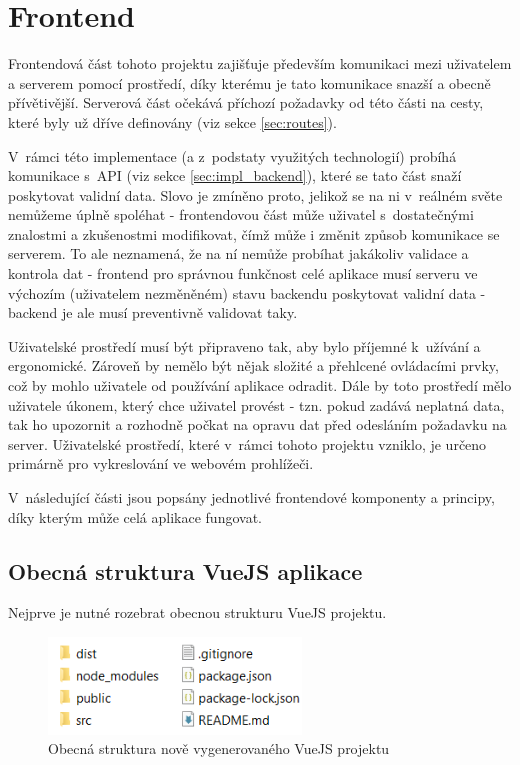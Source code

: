 \section{Frontend}\label{sec:impl_frontend}
Frontendová část tohoto projektu zajišťuje především komunikaci mezi uživatelem a serverem pomocí prostředí, díky kterému je tato komunikace snazší a obecně přívětivější. Serverová část očekává příchozí požadavky od této části na cesty, které byly už dříve definovány (viz sekce \ref{sec:routes}).

V~rámci této implementace (a z~podstaty využitých technologií) probíhá komunikace s~API (viz sekce \ref{sec:impl_backend}), které se tato část snaží poskytovat validní data. Slovo  je zmíněno proto, jelikož se na ni v~reálném světe nemůžeme úplně spoléhat - frontendovou část může uživatel s~dostatečnými znalostmi a zkušenostmi modifikovat, čímž může i změnit způsob komunikace se serverem. To ale neznamená, že na ní nemůže probíhat jakákoliv validace a kontrola dat - frontend pro správnou funkčnost celé aplikace musí serveru ve výchozím (uživatelem nezměněném) stavu backendu poskytovat validní data - backend je ale musí preventivně validovat taky.

Uživatelské prostředí musí být připraveno tak, aby bylo příjemné k~užívání a ergonomické. Zároveň by nemělo být nějak složité a přehlcené ovládacími prvky, což by mohlo uživatele od používání aplikace odradit. Dále by toto prostředí mělo uživatele  úkonem, který chce uživatel provést - tzn. pokud zadává neplatná data, tak ho upozornit a rozhodně počkat na opravu dat před odesláním požadavku na server. Uživatelské prostředí, které v~rámci tohoto projektu vzniklo, je určeno primárně pro vykreslování ve webovém prohlížeči.

V~následující části jsou popsány jednotlivé frontendové komponenty a principy, díky kterým může celá aplikace fungovat.
	
	\subsection{Obecná struktura VueJS aplikace}\label{sec:obecna_str_vuejs}
	Nejprve je nutné rozebrat obecnou strukturu VueJS projektu.
	
	\begin{figure}[H]
		\centering
		\includegraphics[width=0.6\textwidth]{img/vuejs_struktura.png} 
		\caption{Obecná struktura nově vygenerovaného VueJS projektu}
		\label{fig:vuejs_str}
	\end{figure}

